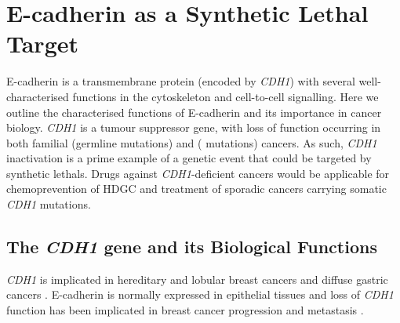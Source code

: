 
\section{E-cadherin as a Synthetic Lethal Target}
\label{CDH1_section}

\gls{E-cadherin} is a transmembrane protein (encoded by \textit{CDH1}) with several well-characterised functions in the cytoskeleton and cell-to-cell signalling. Here we outline the characterised functions of \gls{E-cadherin} and its importance in cancer biology. \textit{CDH1} is a \gls{tumour suppressor} gene, with loss of function occurring in both \gls{familial} (\gls{germline} \glspl{mutation}) and  ( \glspl{mutation}) cancers. As such, \textit{CDH1} inactivation is a prime example of a genetic event that could be targeted by \glspl{synthetic lethal}. %
Drugs against \textit{CDH1}-deficient cancers would be applicable for \gls{chemoprevention} of \gls{HDGC} and \gls{treatment} of sporadic cancers carrying somatic \textit{CDH1} \glspl{mutation}.

\subsection{The \textit{CDH1} gene and its Biological Functions}
\textit{CDH1} is implicated in \gls{hereditary} and  lobular breast cancers and diffuse gastric cancers \citep{Berx1996,DeLeeuw1997,Berx2009,Vos1997,Semb1998,Masciari2007,Guilford1998}. %
\gls{E-cadherin} is normally expressed in epithelial tissues %
and loss of \textit{CDH1} function has been implicated in breast cancer progression and metastasis \citep{Berx1995,Becker1994,Christofori1999}.

